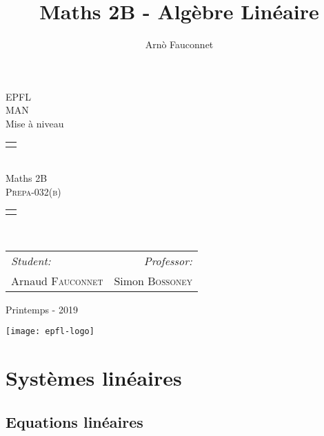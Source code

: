 \documentclass[
    11pt,
    a4paper,
    oneside,
    headinlcude, footinclude,
    twoside,
]{report}
\title{Maths 2B - Algèbre Linéaire}
\author{Arn\`o Fauconnet}
\begin{document}
\begin{titlepage}
   \begin{center}
       \vspace*{\fill}

       {\Huge EPFL}\\ 
       \vfill
       {\huge MAN}\\ [1em]
       {\Large Mise à niveau}\\
        \vfill
        \begin{tabularx}{\textwidth}{X}
            \Xhline{3\arrayrulewidth}\\
        \end{tabularx}\\ [2em]
        {\Huge Maths 2B} \\ [1em]
        \textsc{\huge Prepa-032(b)} \\ [2em]
        \begin{tabularx}{\textwidth}{X}
            \Xhline{3\arrayrulewidth}\\
        \end{tabularx}\\ [2em]
        \vspace{.7cm}
        {\large
        \begin{tabularx}{.9\textwidth}{Xr}
            \textit{Student:} & \textit{Professor:}\\
            Arnaud \textsc{Fauconnet} & Simon \textsc{Bossoney}
        \end{tabularx}}
        \vfill
        {\Large Printemps - 2019}

        \vfill
        \texttt{[image: epfl-logo]}

       \vfill
   \end{center} 
\end{titlepage} 
\setcounter{chapter}{0}
\chapter{Systèmes linéaires}
\label{cha:systemes_lineaires}

\section{Equations linéaires}
\label{sec:equations_lineaires}
\end{document}
